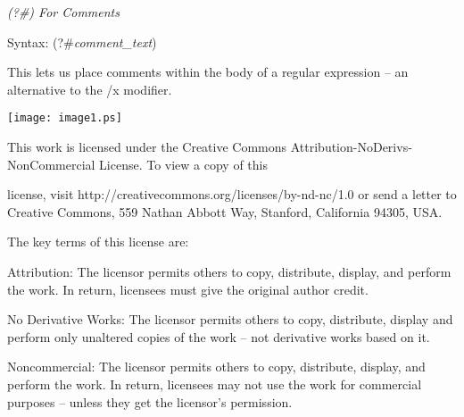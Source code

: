 \documentclass[a4paper,11pt]{book}
\begin{document}
\noindent 

\noindent 

\noindent \textit{(?\#) For Comments}

\noindent Syntax: (?\#\textit{comment\_text})

\noindent 

\noindent This lets us place comments within the body of a regular expression -- an alternative to the /x modifier.

\noindent \eject \eject 

\noindent \texttt{[image: image1.ps]}

\noindent 

\noindent This work is licensed under the Creative Commons Attribution-NoDerivs-NonCommercial License. To view a copy of this

\noindent license, visit http://creativecommons.org/licenses/by-nd-nc/1.0 or send a letter to Creative Commons, 559 Nathan Abbott Way, Stanford, California 94305, USA.

\noindent 

\noindent The key terms of this license are:

\noindent 

\noindent Attribution: The licensor permits others to copy, distribute, display, and perform the work. In return, licensees must give the original author credit.

\noindent 

\noindent No  Derivative  Works: The licensor permits others to copy, distribute, display and perform only unaltered copies of the work -- not derivative works based on it.

\noindent 

\noindent Noncommercial: The licensor permits others to copy, distribute, display, and perform the work. In return, licensees may not use the work for commercial purposes -- unless they get the licensor's permission.
\end{document}
